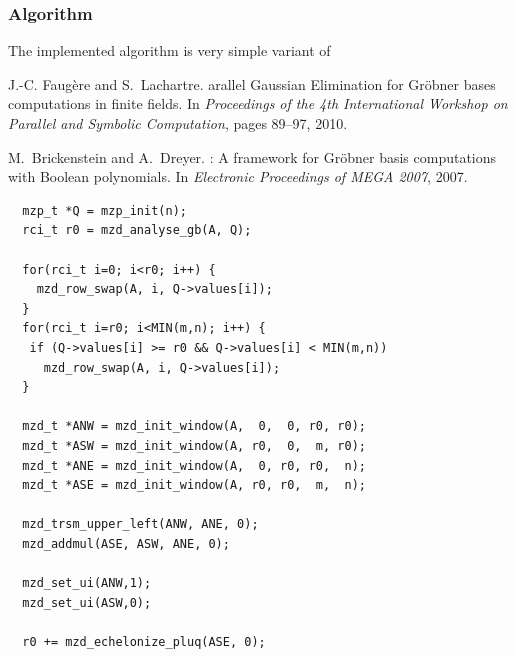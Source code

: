\documentclass[11pt]{beamer}
\begin{document}
\begin{frame}
\frametitle{Algorithm}

The implemented algorithm is very simple variant of \cite{faugere-lachatre:pasco2010,polybori}

\begin{thebibliography}{foobar}
 J.-C. Faug\`ere and S.~Lachartre.
arallel {G}aussian {E}limination for {G}röbner bases computations in finite fields.
\newblock In {\em Proceedings of the 4th International Workshop on Parallel and Symbolic Computation}, pages 89--97, 2010.

 M.\ Brickenstein and A.\ Dreyer.
: A framework for {G}r{\"o}bner basis computations with {B}oolean polynomials.
\newblock In {\em Electronic Proceedings of MEGA 2007}, 2007.
\end{thebibliography}


\framebreak

\begin{lstlisting} 
  mzp_t *Q = mzp_init(n);
  rci_t r0 = mzd_analyse_gb(A, Q);

  for(rci_t i=0; i<r0; i++) {
    mzd_row_swap(A, i, Q->values[i]);
  }
  for(rci_t i=r0; i<MIN(m,n); i++) {
   if (Q->values[i] >= r0 && Q->values[i] < MIN(m,n))
     mzd_row_swap(A, i, Q->values[i]);
  }

  mzd_t *ANW = mzd_init_window(A,  0,  0, r0, r0);
  mzd_t *ASW = mzd_init_window(A, r0,  0,  m, r0);
  mzd_t *ANE = mzd_init_window(A,  0, r0, r0,  n);
  mzd_t *ASE = mzd_init_window(A, r0, r0,  m,  n);

  mzd_trsm_upper_left(ANW, ANE, 0);
  mzd_addmul(ASE, ASW, ANE, 0);

  mzd_set_ui(ANW,1);
  mzd_set_ui(ASW,0);

  r0 += mzd_echelonize_pluq(ASE, 0);
\end{lstlisting}
\end{frame}
\end{document}

